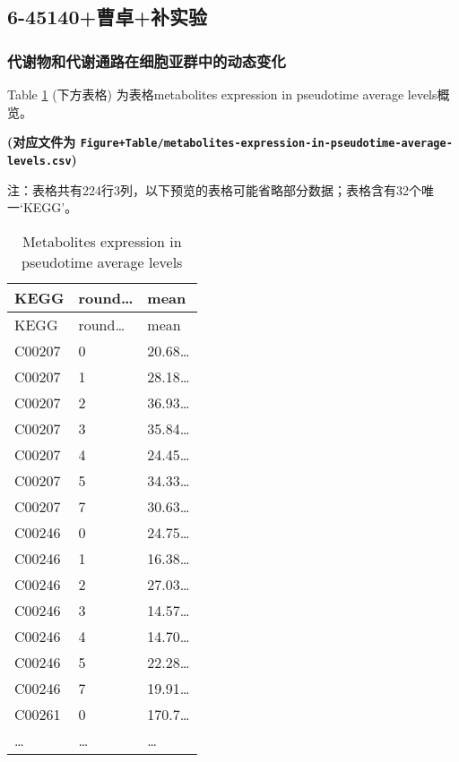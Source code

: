 \documentclass[
]{article}
\begin{document}
\hypertarget{ux66f9ux5353ux8865ux5b9eux9a8c-2}{%
\subsection{6-45140+曹卓+补实验}\label{ux66f9ux5353ux8865ux5b9eux9a8c-2}}

\hypertarget{ux4ee3ux8c22ux7269ux548cux4ee3ux8c22ux901aux8defux5728ux7ec6ux80deux4e9aux7fa4ux4e2dux7684ux52a8ux6001ux53d8ux5316-1}{%
\subsubsection{代谢物和代谢通路在细胞亚群中的动态变化}\label{ux4ee3ux8c22ux7269ux548cux4ee3ux8c22ux901aux8defux5728ux7ec6ux80deux4e9aux7fa4ux4e2dux7684ux52a8ux6001ux53d8ux5316-1}}

Table \ref{tab:metabolites-expression-in-pseudotime-average-levels} (下方表格) 为表格metabolites expression in pseudotime average levels概览。

\textbf{(对应文件为 \texttt{Figure+Table/metabolites-expression-in-pseudotime-average-levels.csv})}

\begin{center}\begin{tcolorbox}[colback=gray!10, colframe=gray!50, width=0.9\linewidth, arc=1mm, boxrule=0.5pt]注：表格共有224行3列，以下预览的表格可能省略部分数据；表格含有32个唯一`KEGG'。
\end{tcolorbox}
\end{center}

\begin{longtable}[]{@{}lll@{}}
\caption{\label{tab:metabolites-expression-in-pseudotime-average-levels}Metabolites expression in pseudotime average levels}\tabularnewline
\toprule
KEGG & round\ldots{} & mean\tabularnewline
\midrule
\endfirsthead
\toprule
KEGG & round\ldots{} & mean\tabularnewline
\midrule
\endhead
C00207 & 0 & 20.68\ldots{}\tabularnewline
C00207 & 1 & 28.18\ldots{}\tabularnewline
C00207 & 2 & 36.93\ldots{}\tabularnewline
C00207 & 3 & 35.84\ldots{}\tabularnewline
C00207 & 4 & 24.45\ldots{}\tabularnewline
C00207 & 5 & 34.33\ldots{}\tabularnewline
C00207 & 7 & 30.63\ldots{}\tabularnewline
C00246 & 0 & 24.75\ldots{}\tabularnewline
C00246 & 1 & 16.38\ldots{}\tabularnewline
C00246 & 2 & 27.03\ldots{}\tabularnewline
C00246 & 3 & 14.57\ldots{}\tabularnewline
C00246 & 4 & 14.70\ldots{}\tabularnewline
C00246 & 5 & 22.28\ldots{}\tabularnewline
C00246 & 7 & 19.91\ldots{}\tabularnewline
C00261 & 0 & 170.7\ldots{}\tabularnewline
\ldots{} & \ldots{} & \ldots{}\tabularnewline
\bottomrule
\end{longtable}
\end{document}

